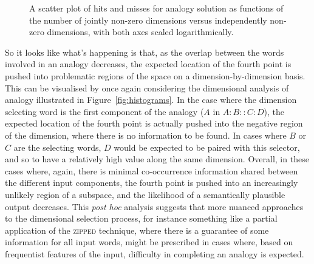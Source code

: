 \begin{figure}
\caption[Analogical Hits and Misses]{A scatter plot of hits and misses for analogy solution as functions of the number of jointly non-zero dimensions versus independently non-zero dimensions, with both axes scaled logarithmically.}
\label{fig:xando}
\end{figure}

So it looks like what's happening is that, as the overlap between the words involved in an analogy decreases, the expected location of the fourth point is pushed into problematic regions of the space on a dimension-by-dimension basis.  This can be visualised by once again considering the dimensional analysis of analogy illustrated in Figure~\ref{fig:histograms}.  In the case where the dimension selecting word is the first component of the analogy ($A$ in $A:B::C:D$), the expected location of the fourth point is actually pushed into the negative region of the dimension, where there is no information to be found.  In cases where $B$ or $C$ are the selecting words, $D$ would be expected to be paired with this selector, and so to have a relatively high value along the same dimension.  Overall, in these cases where, again, there is minimal co-occurrence information shared between the different input components, the fourth point is pushed into an increasingly unlikely region of a subspace, and the likelihood of a semantically plausible output decreases.  This \emph{post hoc} analysis suggests that more nuanced approaches to the dimensional selection process, for instance something like a partial application of the \textsc{zipped} technique, where there is a guarantee of some information for all input words, might be prescribed in cases where, based on frequentist features of the input, difficulty in completing an analogy is expected.

